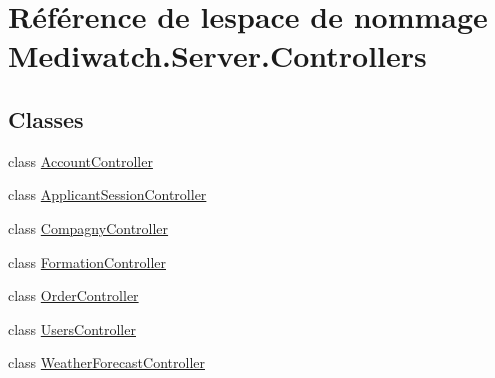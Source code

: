 \hypertarget{namespace_mediwatch_1_1_server_1_1_controllers}{}\section{Référence de l\textquotesingle{}espace de nommage Mediwatch.\+Server.\+Controllers}
\label{namespace_mediwatch_1_1_server_1_1_controllers}
\subsection*{Classes}
\begin{DoxyCompactItemize}
\item 
class \hyperlink{class_mediwatch_1_1_server_1_1_controllers_1_1_account_controller}{Account\+Controller}
\item 
class \hyperlink{class_mediwatch_1_1_server_1_1_controllers_1_1_applicant_session_controller}{Applicant\+Session\+Controller}
\item 
class \hyperlink{class_mediwatch_1_1_server_1_1_controllers_1_1_compagny_controller}{Compagny\+Controller}
\item 
class \hyperlink{class_mediwatch_1_1_server_1_1_controllers_1_1_formation_controller}{Formation\+Controller}
\item 
class \hyperlink{class_mediwatch_1_1_server_1_1_controllers_1_1_order_controller}{Order\+Controller}
\item 
class \hyperlink{class_mediwatch_1_1_server_1_1_controllers_1_1_users_controller}{Users\+Controller}
\item 
class \hyperlink{class_mediwatch_1_1_server_1_1_controllers_1_1_weather_forecast_controller}{Weather\+Forecast\+Controller}
\end{DoxyCompactItemize}
